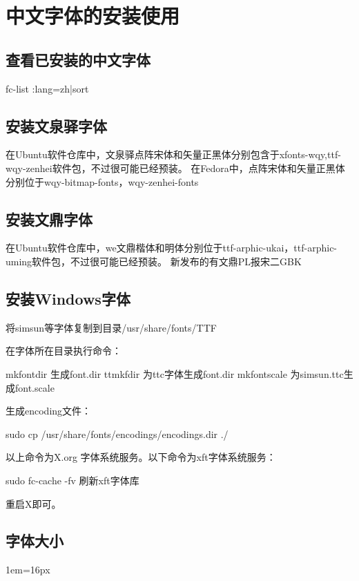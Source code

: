 \section{中文字体的安装使用}
\subsection{查看已安装的中文字体}
\begin{shellcmd}
fc-list :lang=zh|sort
\end{shellcmd}

\subsection{安装文泉驿字体}
在Ubuntu软件仓库中，文泉驿点阵宋体和矢量正黑体分别包含于xfonts-wqy,ttf-wqy-zenhei软件包，不过很可能已经预装。
在Fedora中，点阵宋体和矢量正黑体分别位于wqy-bitmap-fonts，wqy-zenhei-fonts

\subsection{安装文鼎字体}
在Ubuntu软件仓库中，we文鼎楷体和明体分别位于ttf-arphic-ukai，ttf-arphic-uming软件包，不过很可能已经预装。
新发布的有文鼎PL报宋二GBK

\subsection{安装Windows字体}

将simsun等字体复制到目录/usr/share/fonts/TTF

在字体所在目录执行命令：
\begin{shellcmd}
mkfontdir  生成font.dir
ttmkfdir   为ttc字体生成font.dir
mkfontscale 为simsun.ttc生成font.scale
\end{shellcmd}
生成encoding文件：
\begin{shellcmd}
sudo cp /usr/share/fonts/encodings/encodings.dir ./
\end{shellcmd}
以上命令为X.org 字体系统服务。以下命令为xft字体系统服务：
\begin{shellcmd}
sudo fc-cache -fv   刷新xft字体库
\end{shellcmd}
重启X即可。

\subsection{字体大小}
1em=16px

